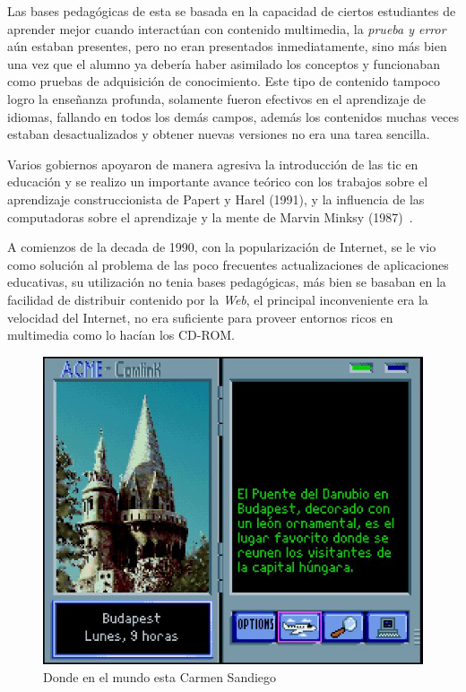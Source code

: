 Las bases pedagógicas de esta se basada en la capacidad de ciertos estudiantes
de aprender mejor cuando interactúan con contenido multimedia, la \emph{prueba y
	error} aún estaban presentes, pero no eran presentados inmediatamente,
sino más bien una vez que el alumno ya debería haber asimilado los conceptos y
funcionaban como pruebas de adquisición de conocimiento. Este tipo de contenido
tampoco logro la enseñanza profunda, solamente fueron efectivos en el
aprendizaje de idiomas, fallando en todos los demás campos\cite{leinonen:ict},
además los contenidos muchas veces estaban desactualizados y obtener nuevas
versiones no era una tarea sencilla.

Varios gobiernos apoyaron de manera agresiva la introducción de las \Gls{tic} en
educación\cite{mcdougall2006theory} y se realizo un importante avance teórico
con los trabajos sobre el aprendizaje construccionista de Papert y Harel (1991),
y la influencia de las computadoras sobre el aprendizaje y la mente de Marvin
Minksy (1987)~\cite{mcdougall2006theory}.

A comienzos de la decada de 1990, con la popularización de Internet, se le vio
como solución al problema de las poco frecuentes actualizaciones de aplicaciones
educativas, su utilización no tenia bases pedagógicas, más bien se basaban en la
facilidad de distribuir contenido por la \emph{Web}, el principal inconveniente
era la velocidad del Internet, no era suficiente para proveer entornos ricos en
multimedia como lo hacían los CD-ROM\cite{leinonen:ict}.

\begin{figure}[h!] 
	\centering 
	\includegraphics[scale=0.5]{tics/carmen.jpg}
	\caption{Donde en el mundo esta Carmen Sandiego} 
	\label{fig:carmen}
\end{figure}

